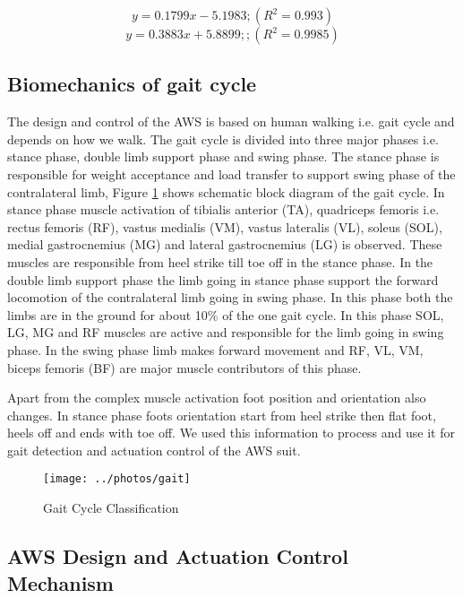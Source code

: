 \documentclass[letterpaper, 10 pt, conference]{ieeeconf}  %
\begin{document}
\begin{equation}\label{pgmunstreched}
y=0.1799x - 5.1983; (R^2=0.993)
\end{equation}
\begin{equation}\label{pgmstreched}
y = 0.3883x + 5.8899; ; (R^2=0.9985)
\end{equation}

\subsection{Biomechanics of gait cycle } \label{gaitcycle}
The design and control of the AWS is based on human walking i.e. gait cycle and depends on how we walk. The gait cycle is divided into three major phases i.e. stance phase, double limb support phase and swing phase. The stance phase is responsible for weight acceptance and load transfer to support swing phase of the contralateral limb, Figure \ref{fig:gait} shows schematic block diagram of the gait cycle. In stance phase muscle activation of tibialis anterior (TA), quadriceps femoris i.e. rectus femoris (RF), vastus medialis (VM), vastus lateralis (VL), soleus (SOL), medial gastrocnemius (MG) and lateral gastrocnemius (LG) is observed. These muscles are responsible from heel strike till toe off in the stance phase. In the double limb support phase the limb going in stance phase support the forward locomotion of the contralateral limb going in swing phase. In this phase both the limbs are in the ground for about 10\% of the one gait cycle. In this phase SOL, LG, MG and RF muscles are active and responsible for the limb going in swing phase. In the swing phase limb makes forward movement and RF, VL, VM, biceps femoris (BF)  are major muscle contributors of this phase. 

Apart from the complex muscle activation foot position and orientation also changes. In stance phase foots orientation start from heel strike then flat foot, heels off and ends with toe off. We used this information to process and use it for gait detection and actuation control of the AWS suit. 

\begin{figure}
	\centering
	\texttt{[image: ../photos/gait]}
	\caption{Gait Cycle Classification}
	\label{fig:gait}
\end{figure}


\subsection{AWS Design and Actuation Control Mechanism}
\end{document}
